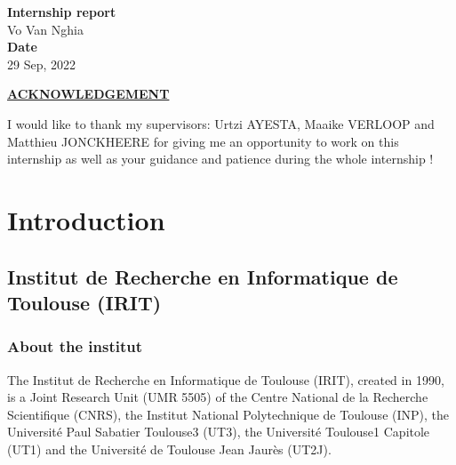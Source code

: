\documentclass[
  a4paper, xcolor = usenames,dvipsnames]{article}
\author{}
\date{\vspace{-2.5em}}
\theoremstyle{definition}
\theoremstyle{definition}
\theoremstyle{definition}
\theoremstyle{definition}
\theoremstyle{remark}
\begin{document}
\onehalfspacing


\vspace*{\fill}
\begin{center}
  \Large{\textbf{Internship report}}\\
  \vspace*{1\baselineskip}
  Vo Van Nghia\\
  \vfill
  \vspace*{\fill}
  \Large{\textbf{Date}}\\
  29 Sep, 2022
\end{center}

\newpage

\newpage
{}
\renewcommand{\contentsname}{Table of contents}
\tableofcontents

\newpage

\begin{center}
  \underline{\textbf{ACKNOWLEDGEMENT}}
\end{center}
I would like to thank my supervisors: Urtzi AYESTA, Maaike VERLOOP and Matthieu JONCKHEERE for giving me an opportunity to work on this internship as well as your guidance and patience during the whole internship !

\newpage
{}

\hypertarget{introduction}{%
\section{Introduction}\label{introduction}}

\hypertarget{institut-de-recherche-en-informatique-de-toulouse-irit}{%
\subsection{Institut de Recherche en Informatique de Toulouse (IRIT)}\label{institut-de-recherche-en-informatique-de-toulouse-irit}}

\hypertarget{about-the-institut}{%
\subsubsection{About the institut}\label{about-the-institut}}

The Institut de Recherche en Informatique de Toulouse (IRIT), created in 1990, is a Joint Research Unit (UMR 5505) of the Centre National de la Recherche Scientifique (CNRS), the Institut National Polytechnique de Toulouse (INP), the Université Paul Sabatier Toulouse3 (UT3), the Université Toulouse1 Capitole (UT1) and the Université de Toulouse Jean Jaurès (UT2J).
\end{document}

